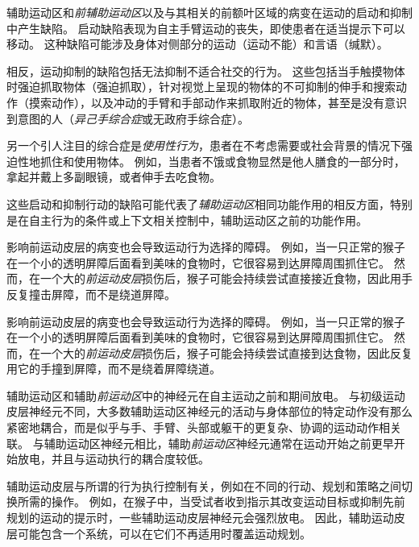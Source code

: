 \begin{proposition} \label{box:34_2}
	
	\quad \quad 辅助运动区和\textit{前辅助运动区}以及与其相关的前额叶区域的病变在运动的启动和抑制中产生缺陷。
	启动缺陷表现为自主手臂运动的丧失，即使患者在适当提示下可以移动。
	这种缺陷可能涉及身体对侧部分的运动（运动不能）和言语（缄默）。
	
	\quad \quad 相反，运动抑制的缺陷包括无法抑制不适合社交的行为。
	这些包括当手触摸物体时强迫抓取物体（强迫抓取），针对视觉上呈现的物体的不可抑制的伸手和搜索动作（摸索动作），以及冲动的手臂和手部动作来抓取附近的物体，甚至是没有意识到意图的人（\textit{异己手综合症}或无政府手综合症）。
	
	\quad \quad 另一个引人注目的综合症是\textit{使用性行为}，患者在不考虑需要或社会背景的情况下强迫性地抓住和使用物体。
	例如，当患者不饿或食物显然是他人膳食的一部分时，拿起并戴上多副眼镜，或者伸手去吃食物。
	
	\quad \quad 这些启动和抑制行动的缺陷可能代表了\textit{辅助运动区}相同功能作用的相反方面，特别是在自主行为的条件或上下文相关控制中，辅助运动区之前的功能作用。
	
	\quad \quad 影响前运动皮层的病变也会导致运动行为选择的障碍。
	例如，当一只正常的猴子在一个小的透明屏障后面看到美味的食物时，它很容易到达屏障周围抓住它。
	然而，在一个大的\textit{前运动皮层}损伤后，猴子可能会持续尝试直接接近食物，因此用手反复撞击屏障，而不是绕道屏障。
	
	\quad \quad 影响前运动皮层的病变也会导致运动行为选择的障碍。
	例如，当一只正常的猴子在一个小的透明屏障后面看到美味的食物时，它很容易到达屏障周围抓住它。
	然而，在一个大的\textit{前运动皮层}损伤后，猴子可能会持续尝试直接到达食物，因此反复用它的手撞到屏障，而不是绕着屏障绕道。
	
\end{proposition}


辅助运动区和辅助\textit{前运动区}中的神经元在自主运动之前和期间放电。
与初级运动皮层神经元不同，大多数辅助运动区神经元的活动与身体部位的特定动作没有那么紧密地耦合，而是似乎与手、手臂、头部或躯干的更复杂、协调的运动动作相关联。
与辅助运动区神经元相比，辅助\textit{前运动区}神经元通常在运动开始之前更早开始放电，并且与运动执行的耦合度较低。


辅助运动皮层与所谓的行为执行控制有关，例如在不同的行动、规划和策略之间切换所需的操作。
例如，在猴子中，当受试者收到指示其改变运动目标或抑制先前规划的运动的提示时，一些辅助运动皮层神经元会强烈放电。
因此，辅助运动皮层可能包含一个系统，可以在它们不再适用时覆盖运动规划。


